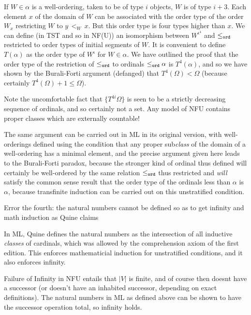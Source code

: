 \documentclass[12pt]{slides}
\begin{document}
\begin{slide}

If $W \in \alpha$ is a well-ordering, taken to be of type $i$ objects, $W$ is of type $i+3$.  Each element $x$ of the domain of $W$ can be associated with the order type of the order $W_x$ restricting $W$ to $y \,<_W \,x$.  But this order type is four types higher than $x$.  We can define (in TST and so in NF(U)) an isomorphism between
$W^{\iota^4}$ and $\leq_{\tt ord}$ restricted to order types of initial segments of $W$.  It is convenient to define $T(\alpha)$ as the order type of $W^\iota$ for
$W \in \alpha$.  We have outlined the proof that the order type of the restriction of $\leq_{\tt ord}$ to ordinals $\leq_{\tt ord} \alpha$ is
$T^4(\alpha)$, and so we have shown by the Burali-Forti argument (defanged) that $T^4(\Omega)<\Omega$ (because certainly  $T^4(\Omega)+1\leq \Omega$).


Note the uncomfortable fact that $\{T^{4i}\Omega\}$ is seen to be a strictly decreasing sequence of ordinals, and so certainly not a set.  Any model of NFU contains proper classes which are externally countable!

\end{slide}

\begin{slide}

The same argument can be carried out in ML in its original version, with well-orderings defined using the condition that any proper sub{\em class\/} of the domain of a well-ordering has a minimal element, and the precise argument given here leads to the Burali-Forti paradox, because the stronger kind of ordinal thus defined will certainly be well-ordered by the same relation $\leq_{\tt ord}$ thus restricted and {\em will\/} satisfy the common sense result that the order
type of the ordinals less than $\alpha$ is $\alpha$, because transfinite induction can be carried out on this unstratified condition.

\end{slide}

\begin{slide}

{\Large Error the fourth:  the natural numbers cannot be defined so as to get infinity and math induction as Quine claims}

In ML, Quine defines the natural numbers as the intersection of all inductive {\em classes\/} of cardinals, which was allowed by the comprehension axiom of the first edition.  This enforces mathematicial induction for unstratified conditions, and it also enforces infinity.

Failure of Infinity in NFU entails that $|V|$ is finite, and of course then doesnt have a successor (or doesn't have an inhabited successor, depending on exact definitions).  The natural numbers in ML as defined above can be shown to have the successor operation total, so infinity holds.

\end{slide}
\end{document}
